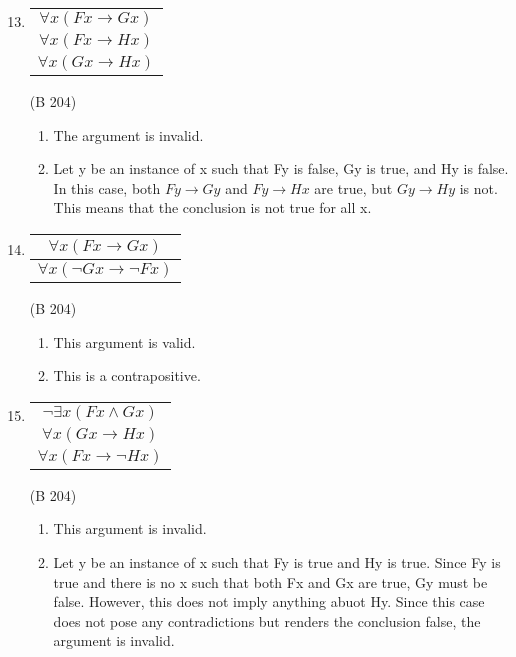 \documentclass{article}
\begin{document}
\begin{enumerate}
      \setcounter{enumi}{12}
      \item \begin{tabular}{c}
                  $\forall x(Fx \to Gx)$ \\
                  $\forall x(Fx \to Hx)$ \\
                  \hline
                  $\forall x(Gx \to Hx)$
            \end{tabular}
            (B 204)

            \begin{enumerate}
                  \item The argument is invalid.
                  \item Let y be an instance of x such that Fy is false, Gy is true, and Hy is false. In this case, both $Fy \to Gy$ and $Fy \to Hx$ are true, but $Gy \to Hy$ is not. This means that the conclusion is not true for all x.
            \end{enumerate}
      \item \begin{tabular}{c}
                  $\forall x(Fx \to Gx)$ \\
                  \hline
                  $\forall x(\neg Gx \to \neg Fx)$
            \end{tabular}
            (B 204)
            \begin{enumerate}
                  \item This argument is valid.
                  \item This is a contrapositive.
            \end{enumerate}
      \item \begin{tabular}{c}
                  $\neg \exists x(Fx \land Gx)$ \\
                  $\forall x(Gx \to Hx)$        \\
                  \hline
                  $\forall x(Fx \to \neg Hx)$
            \end{tabular}
            (B 204)
            \begin{enumerate}
                  \item This argument is invalid.
                  \item Let y be an instance of x such that Fy is true and Hy is true. Since Fy is true and there is no x such that both Fx and Gx are true, Gy must be false. However, this does not imply anything abuot Hy. Since this case does not pose any contradictions but renders the conclusion false, the argument is invalid.
            \end{enumerate}

\end{enumerate}
\end{document}
